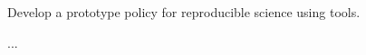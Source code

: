 \begin{task}[
  title=Prototype Policy,
  id=policy,
  lead=SRL,
  PM=1,
  wphases={0-36},
  partners={XXX}
]
  Develop a prototype policy for reproducible science using \TheProject tools.

  \begin{compactitem}
  \item ...
  \end{compactitem}
\end{task}
